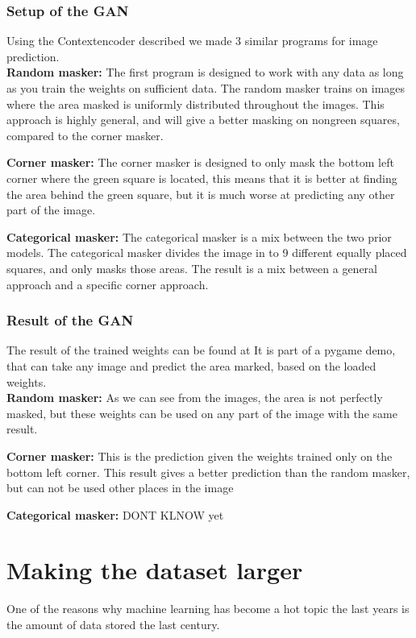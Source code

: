     
    
  \subsubsection{Setup of the GAN}
  Using the Contextencoder described we made 3 %
  similar programs for image prediction.\\
  \vspace{5px}
  \textbf{Random masker:} The first program is designed to work with any data as long as you train the weights on sufficient data. The random masker trains on images where the area masked is 
  uniformly distributed throughout the images. This approach is highly general, and will give a better masking on nongreen squares, compared to the corner masker.  
  
  \vspace{5px}
  \textbf{Corner masker:} The corner masker is designed to only mask the bottom left corner where the green square is located, this means that it is better at finding the area behind the green square, but it is much 
  worse at predicting any other part of the image.
  
  \vspace{5px}
  \textbf{Categorical masker:} The categorical masker is a mix between the two prior models. The categorical masker divides the image in to 9 different equally placed squares, and only masks those areas. %
  The result is a mix between a general approach and a specific corner approach.

  
  \subsubsection{Result of the GAN}
  The result of the trained weights can be found at %
  It is part of a pygame demo, that can take any image and predict the area marked, based on the loaded weights.\\
  
  \vspace{5px}
  \textbf{Random masker:}
  As we can see from the images, the area is not perfectly masked, but these weights can be used on any part of the image with the same result.
  
  \vspace{5px}
  \textbf{Corner masker:}  
  This is the prediction given the weights trained only on the bottom left corner. This result gives a better prediction than the random masker, but can not be used other places in the image
  
  \vspace{5px}
  \textbf{Categorical masker:} 
  DONT KLNOW yet
  
  
  
  
  
  
  
\section{Making the dataset larger}
  One of the reasons why machine learning has become a hot topic the last years is the amount of data stored the last century. %
  